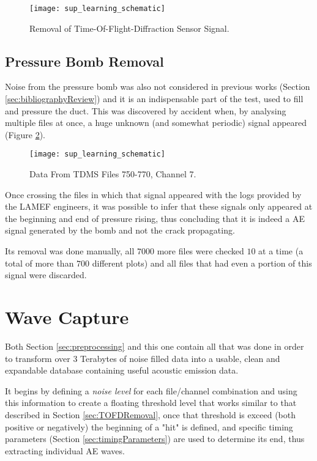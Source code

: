 \begin{figure}[H]
	\centering
	\texttt{[image: sup\_learning\_schematic]}
	\caption{Removal of Time-Of-Flight-Diffraction Sensor Signal.}
	\label{fig:TOFD_window_example}
\end{figure}


\subsection{Pressure Bomb Removal} \label{sec:bombRemoval}

Noise from the pressure bomb was also not considered in previous works (Section \ref{sec:bibliographyReview}) and it is an indispensable part of the test, used to fill and pressure the duct. This was discovered by accident when, by analysing multiple files at once, a huge unknown (and somewhat periodic) signal appeared (Figure \ref{fig:pressure_bomb}).

\begin{figure}[H]
 	\centering
 	\texttt{[image: sup\_learning\_schematic]}
 	\caption{Data From TDMS Files 750-770, Channel 7.}
 	\label{fig:pressure_bomb}
\end{figure}
 
Once crossing the files in which that signal appeared with the logs provided by the LAMEF engineers, it was possible to infer that these signals only appeared at the beginning and end of pressure rising, thus concluding that it is indeed a AE signal generated by the bomb and not the crack propagating.

Its removal was done manually, all $7000$ more files were checked $10$ at a time (a total of more than $700$ different plots) and all files that had even a portion of this signal were discarded.

\section{Wave Capture}\label{sec:waveCapture}

Both Section \ref{sec:preprocessing} and this one contain all that was done in order to transform over $3$ Terabytes of noise filled data into a usable, clean and expandable database containing useful acoustic emission data.

It begins by defining a \textit{noise level} for each file/channel combination and using this information to create a floating threshold level that works similar to that described in Section \ref{sec:TOFDRemoval}, once that threshold is exceed (both positive or negatively) the beginning of a "hit" is defined, and specific timing parameters (Section \ref{sec:timingParameters}) are used to determine its end, thus extracting individual AE waves.

